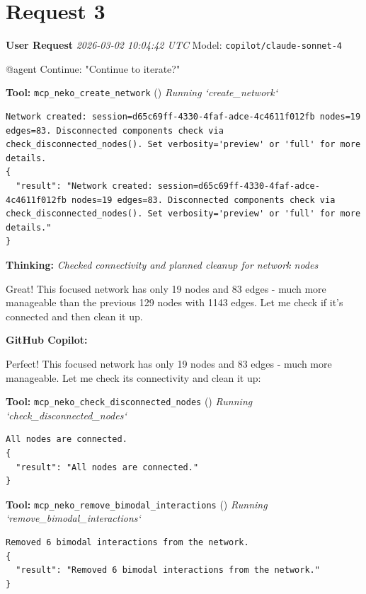 \documentclass[11pt,a4paper]{article}
\begin{document}
\section{Request 3}
\begin{userbox}
\textbf{User Request}
\quad \textit{2026-03-02 10:04:42 UTC}
\quad Model: \texttt{copilot/claude-sonnet-4}

@agent Continue: "Continue to iterate?"

\end{userbox}
\begin{toolokbox}
\textbf{Tool:} \texttt{mcp\_neko\_create\_network} (\checkmark)
\textit{Running `create\_network`}
\begin{lstlisting}
Network created: session=d65c69ff-4330-4faf-adce-4c4611f012fb nodes=19 edges=83. Disconnected components check via check_disconnected_nodes(). Set verbosity='preview' or 'full' for more details.
{
  "result": "Network created: session=d65c69ff-4330-4faf-adce-4c4611f012fb nodes=19 edges=83. Disconnected components check via check_disconnected_nodes(). Set verbosity='preview' or 'full' for more details."
}
\end{lstlisting}
\end{toolokbox}
\begin{thinkbox}
\textbf{Thinking:} \textit{Checked connectivity and planned cleanup for network nodes}

Great! This focused network has only 19 nodes and 83 edges - much more manageable than the previous 129 nodes with 1143 edges. Let me check if it's connected and then clean it up.

\end{thinkbox}
\begin{copilotbox}
\textbf{GitHub Copilot:}

Perfect! This focused network has only 19 nodes and 83 edges - much more manageable. Let me check its connectivity and clean it up:

\end{copilotbox}
\begin{toolokbox}
\textbf{Tool:} \texttt{mcp\_neko\_check\_disconnected\_nodes} (\checkmark)
\textit{Running `check\_disconnected\_nodes`}
\begin{lstlisting}
All nodes are connected.
{
  "result": "All nodes are connected."
}
\end{lstlisting}
\end{toolokbox}
\begin{toolokbox}
\textbf{Tool:} \texttt{mcp\_neko\_remove\_bimodal\_interactions} (\checkmark)
\textit{Running `remove\_bimodal\_interactions`}
\begin{lstlisting}
Removed 6 bimodal interactions from the network.
{
  "result": "Removed 6 bimodal interactions from the network."
}
\end{lstlisting}
\end{toolokbox}
\end{document}
